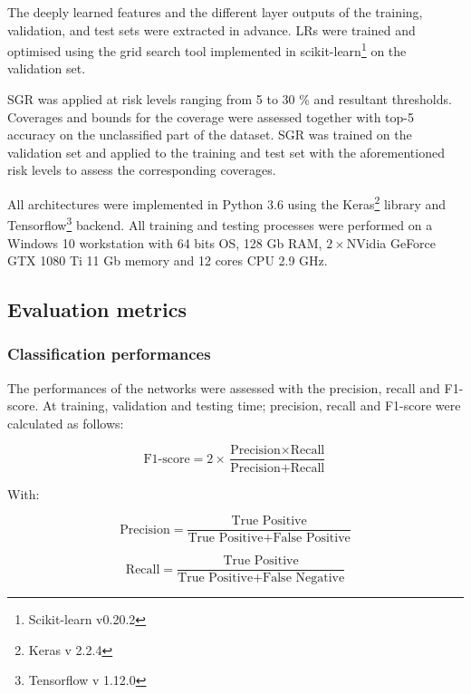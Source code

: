 The deeply learned features and the different layer outputs of the training, validation, and test sets were extracted in advance. LRs were trained and optimised using the grid search tool implemented in scikit-learn\footnote{Scikit-learn v0.20.2} on the validation set.

SGR was applied at risk levels ranging from 5 to 30 \% and resultant thresholds. Coverages and bounds for the coverage were assessed together with top-5 accuracy on the unclassified part of the dataset. SGR was trained on the validation set and applied to the training and test set with the aforementioned risk levels to assess the corresponding coverages.

All architectures were implemented in Python 3.6 using the Keras\footnote{Keras v 2.2.4} library and Tensorflow\footnote{Tensorflow v 1.12.0} backend. All training and testing processes were performed on a Windows 10 workstation with 64 bits OS, 128 Gb RAM, \(2 \times\)NVidia GeForce GTX 1080 Ti 11 Gb memory and 12 cores CPU 2.9 GHz.

\subsection{Evaluation metrics}\label{chapitre1_5.2}

\subsubsection{Classification performances}\label{chapitre1_5.2.1}

The performances of the networks were assessed with the precision, recall and F1-score. At training, validation and testing time; precision, recall and F1-score were calculated as follows:

\begin{equation}
\text{F1-score}=2\times\frac{\text{Precision}\times\text{Recall}}{\text{Precision}+\text{Recall}}
\label{eq1.1}
\end{equation}

With:

\begin{equation}
\text{Precision}=\frac{\text{True Positive}}{\text{True Positive}+\text{False Positive}}
\label{eq1.2}
\end{equation}

\begin{equation}
\text{Recall}=\frac{\text{True Positive}}{\text{True Positive}+\text{False Negative}}
\label{eq1.3}
\end{equation}

